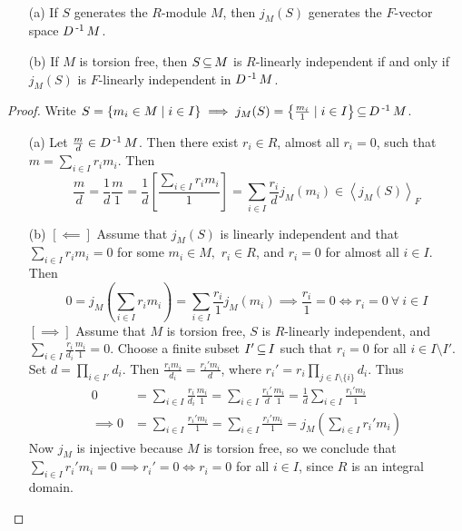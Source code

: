 \documentclass[11pt]{book}
\theoremstyle{definition}   \newtheorem{defn}[counter]{Definition} %
\newcommand{\bs}{\setminus}   \newcommand{\A}{\mathcal{A}}   \newcommand{\sy}{\textnormal{Syl}}   \newcommand{\size}[1]{\left| #1 \right|}
\newcommand{\gen}[1]{\left\langle #1 \right\rangle}   \newcommand{\stab}[2]{\tn{Stab}_{#1}(#2)}   \newcommand{\fix}[2]{\tn{Fix}_{#1}(#2)}   \newcommand{\op}{^{\tn{op}}}
\numberwithin{counter}{chapter}
\begin{document}
\begin{lemma}\
\begin{enumerate}
\item[(a)] If $S$ generates the $R$-module $M$, then $j_M(S)$ generates the $F$-vector space $D\operatorname{^{-1}} M$.
\item[(b)] If $M$ is torsion free, then $S \operatorname{\subseteq} M$ is $R$-linearly independent if and only if $j_M(S)$ is $F$-linearly independent in $D\operatorname{^{-1}} M$.
\end{enumerate}
\end{lemma}

\begin{proof} Write $S = \{m_i \in M \mid i \in I\} \implies j_M(S) = \left\{ \frac{m_i}{1} \mid i \in I \right\} \operatorname{\subseteq} D\operatorname{^{-1}} M$.
\begin{enumerate}
\item[(a)] Let $\frac{m}{d} \in D\operatorname{^{-1}} M$. Then there exist $r_i \in R$, almost all $r_i = 0$, such that $m = \sum_{i \in I} r_i m_i$. Then
	\[\frac{m}{d} = \frac{1}{d} \frac{m}{1} = \frac{1}{d} \left[\frac{\sum_{i \in I} r_i m_i}{1}\right] = \sum_{i \in I} \frac{r_i}{d} j_M(m_i) \in \gen{j_M(S)}_F \]
\item[(b)] $[\impliedby]$ Assume that $j_M(S)$ is linearly independent and that $\sum_{i \in I} r_i m_i = 0$ for some $m_i \in M,$ $r_i \in R$, and $r_i = 0$ for almost all $i \in I$. Then
	\[0 = j_M \left(\sum_{i \in I} r_i m_i\right) = \sum_{i \in I} \frac{r_i}{1} j_M(m_i) \implies \frac{r_i}{1} = 0 \iff r_i = 0 \ \forall \ i \in I \]
$[\implies]$ Assume that $M$ is torsion free, $S$ is $R$-linearly independent, and $\sum_{i \in I} \frac{r_i}{d_i} \frac{m_i}{1} = 0$. Choose a finite subset $I' \operatorname{\subseteq} I$ such that $r_i = 0$ for all $i \in I \bs I'$. Set $d = \prod_{i \in I'} d_i$. Then $\frac{r_i m_i}{d_i} = \frac{r_i' m_i}{d}$, where $r_i' = r_i \prod_{j \in I \bs \{i\}} d_i$. Thus
\begin{align*}
0 &= \sum_{i \in I} \frac{r_i}{d_i} \frac{m_i}{1} = \sum_{i \in I} \frac{r_i'}{d} \frac{m_i}{1} = \frac{1}{d} \sum_{i \in I} \frac{r_i' m_i}{1} \\
\implies 0 &= \sum_{i \in I} \frac{r_i' m_i}{1} = \sum_{i \in I} \frac{r_i' m_i}{1} = j_M\left(\sum_{i \in I} r_i' m_i\right)
\end{align*}
Now $j_M$ is injective because $M$ is torsion free, so we conclude that $\sum_{i \in I} r_i' m_i = 0 \implies r_i' = 0 \iff r_i = 0$ for all $i \in I$, since $R$ is an integral domain.
\end{enumerate}
\end{proof}
\end{document}
